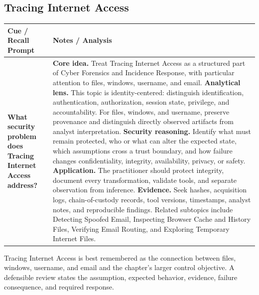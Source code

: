 \documentclass[11pt]{article}
\newcommand{\CornellHeader}{%
\rowcolor{Navy}\color{white}\bfseries Cue / Recall Prompt & \color{white}\bfseries Notes / Analysis\\\hline}
\newcommand{\CornellRow}[2]{%
\cellcolor{CueGray}\RaggedRight\textbf{#1} & \RaggedRight #2\\\hline}
\begin{document}
\subsection*{Tracing Internet Access}
\begin{longtable}{>{\RaggedRight\arraybackslash}p{}|>{\RaggedRight\arraybackslash}p{}}
\CornellHeader
\CornellRow{What security problem does Tracing Internet Access address?}{\textbf{Core idea.} Treat Tracing Internet Access as a structured part of Cyber Forensics and Incidence Response, with particular attention to files, windows, username, and email. \textbf{Analytical lens.} This topic is identity-centered: distinguish identification, authentication, authorization, session state, privilege, and accountability. For files, windows, and username, preserve provenance and distinguish directly observed artifacts from analyst interpretation. \textbf{Security reasoning.} Identify what must remain protected, who or what can alter the expected state, which assumptions cross a trust boundary, and how failure changes confidentiality, integrity, availability, privacy, or safety. \textbf{Application.} The practitioner should protect integrity, document every transformation, validate tools, and separate observation from inference. \textbf{Evidence.} Seek hashes, acquisition logs, chain-of-custody records, tool versions, timestamps, analyst notes, and reproducible findings. Related subtopics include Detecting Spoofed Email, Inspecting Browser Cache and History Files, Verifying Email Routing, and Exploring Temporary Internet Files.}
\end{longtable}
\begin{topicsummary}
Tracing Internet Access is best remembered as the connection between files, windows, username, and email and the chapter's larger control objective. A defensible review states the assumption, expected behavior, evidence, failure consequence, and required response.
\end{topicsummary}
\end{document}
